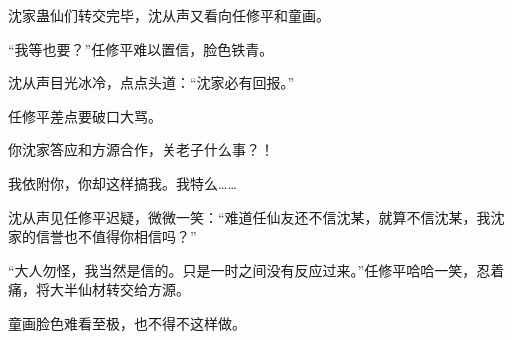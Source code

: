 \begin{this_body}
沈家蛊仙们转交完毕，沈从声又看向任修平和童画。

“我等也要？”任修平难以置信，脸色铁青。

沈从声目光冰冷，点点头道：“沈家必有回报。”

任修平差点要破口大骂。

你沈家答应和方源合作，关老子什么事？！

我依附你，你却这样搞我。我特么……

沈从声见任修平迟疑，微微一笑：“难道任仙友还不信沈某，就算不信沈某，我沈家的信誉也不值得你相信吗？”

“大人勿怪，我当然是信的。只是一时之间没有反应过来。”任修平哈哈一笑，忍着痛，将大半仙材转交给方源。

童画脸色难看至极，也不得不这样做。

\end{this_body}

